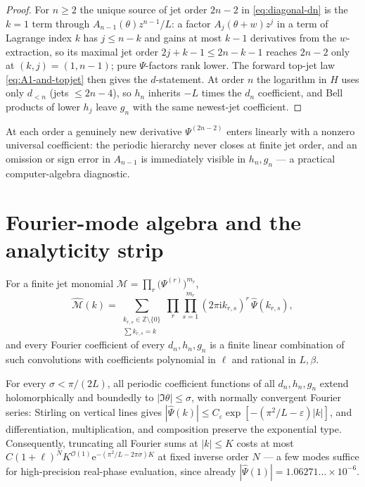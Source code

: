 \documentclass[11pt,oneside]{article}
\numberwithin{equation}{section}
\theoremstyle{definition}
\theoremstyle{remark}
\newcommand{\Z}{\mathbb Z}
\newcommand{\e}{\mathrm e}
\newcommand{\ii}{\mathrm i}
\newcommand{\bigO}{\mathcal O}
\newcommand{\eps}{\varepsilon}
\newcommand{\abs}[1]{\left\lvert #1\right\rvert}
\newcommand{\Psihat}{\widehat\Psi}
\begin{document}
\begin{proof}
For $n\ge2$ the unique source of jet order $2n-2$ in
\eqref{eq:diagonal-dn} is the $k=1$ term through
$A_{n-1}(\theta)z^{n-1}/L$: a factor $A_j(\theta+w)z^{j}$ in a term
of Lagrange index $k$ has $j\le n-k$ and gains at most $k-1$
derivatives from the $w$-extraction, so its maximal jet order
$2j+k-1\le2n-k-1$ reaches $2n-2$ only at $(k,j)=(1,n-1)$; pure
$\Psi$-factors rank lower.  The forward top-jet law
\eqref{eq:A1-and-topjet} then gives the $d$-statement.  At order $n$
the logarithm in $H$ uses only $d_{<n}$ (jets $\le2n-4$), so
$h_n$ inherits $-L$ times the $d_n$ coefficient, and Bell products of
lower $h_j$ leave $g_n$ with the same newest-jet coefficient.
\end{proof}

At each order a genuinely new derivative $\Psi^{(2n-2)}$ enters
linearly with a nonzero universal coefficient: the periodic hierarchy
never closes at finite jet order, and an omission or sign error in
$A_{n-1}$ is immediately visible in $h_n,g_n$ --- a practical
computer-algebra diagnostic.

\section{Fourier-mode algebra and the analyticity strip}
\label{sec:fourier}

\begin{proposition}
\label{prop:convolutions}
For a finite jet monomial
$\mathcal M=\prod_{r}\bigl(\Psi^{(r)}\bigr)^{m_r}$,
\begin{equation}
 \widehat{\mathcal M}(k)
 =\sum_{\substack{k_{r,s}\in\Z\setminus\{0\}\\ \sum k_{r,s}=k}}
 \prod_{r}\prod_{s=1}^{m_r}
 (2\pi\ii k_{r,s})^{r}\,\Psihat(k_{r,s}),
 \label{eq:convolution}
\end{equation}
and every Fourier coefficient of every $d_n,h_n,g_n$ is a finite
linear combination of such convolutions with coefficients polynomial
in $\ell$ and rational in $L,\beta$.
\end{proposition}

\begin{proposition}
\label{prop:strip}
For every $\sigma<\pi/(2L)$, all periodic coefficient functions of
all $d_n,h_n,g_n$ extend holomorphically and boundedly to
$\abs{\Im\theta}\le\sigma$, with normally convergent Fourier series:
Stirling on vertical lines gives
$\abs{\Psihat(k)}\le C_\eps\exp[-(\pi^{2}/L-\eps)\abs k]$, and
differentiation, multiplication, and composition preserve the
exponential type.  Consequently, truncating all Fourier sums at
$\abs k\le K$ costs at most
$C(1+\ell)^{N}K^{\bigO(1)}
\e^{-(\pi^{2}/L-2\pi\sigma)K}$ at fixed inverse order $N$ --- a few
modes suffice for high-precision real-phase evaluation, since already
$\abs{\Psihat(1)}=1.06271\ldots\times10^{-6}$.
\end{proposition}
\end{document}

